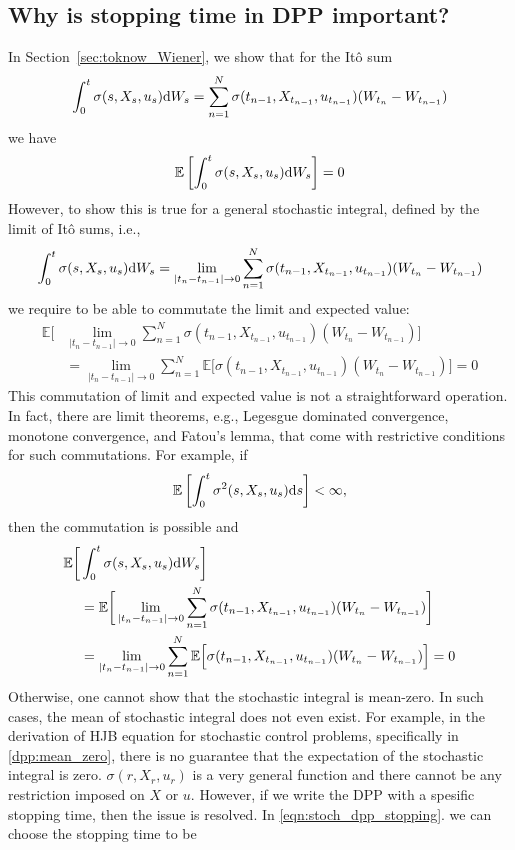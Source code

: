 \documentclass[11pt]{book}
\newcommand{\ds}{\text{\normalfont d}s}
\newcommand{\dW}{\text{\normalfont d}W}
\begin{document}
\subsection{Why is stopping time in DPP important?}
In Section~\ref{sec:toknow_Wiener}, we show that for the Itô sum
\[
\int_0^t \sigma(s,X_s,u_s)\dW_s = \sum_{n=1}^{N} \sigma(t_{n-1},X_{t_{n-1}},u_{t_{n-1}})(W_{t_{n}}-W_{t_{n-1}}) 
\]
we have
\[
\mathbb{E}\left[\int_0^t \sigma(s,X_s,u_s)\dW_s\right]=0
\]
However, to show this is true for a general stochastic integral, defined by the limit of Itô sums, i.e., 
\begin{equation*}
\int_0^t \sigma(s,X_s,u_s)\dW_s = \lim_{|t_n-t_{n-1}|\to0}\sum_{n=1}^{N} \sigma(t_{n-1},X_{t_{n-1}},u_{t_{n-1}})(W_{t_{n}}-W_{t_{n-1}})    
\end{equation*}
we require to be able to commutate the limit and expected value: 
\[
\begin{split}
    \mathbb{E}\bigg[&\lim_{|t_n-t_{n-1}|\to0}\sum_{n=1}^{N} \sigma(t_{n-1},X_{t_{n-1}},u_{t_{n-1}})(W_{t_{n}}-W_{t_{n-1}}) \bigg]\\
    &=\lim_{|t_n-t_{n-1}|\to0}\sum_{n=1}^{N} \mathbb{E}\Big[\sigma(t_{n-1},X_{t_{n-1}},u_{t_{n-1}})(W_{t_{n}}-W_{t_{n-1}})\Big]=0
\end{split}
\]
This commutation of limit and expected value is not a straightforward operation. In fact, there are limit theorems, e.g., Legesgue dominated convergence, monotone convergence, and Fatou's lemma, that come with restrictive conditions for such commutations.
For example, if 
\[
\mathbb{E}\left[\int_0^t \sigma^2(s,X_s,u_s)\ds\right]<\infty,
\]
then the commutation is possible and 
\[
\begin{split}
\mathbb{E}\bigg[&\int_0^t \sigma(s,X_s,u_s)\dW_s\bigg]\\
    &=\mathbb{E}\bigg[\lim_{|t_n-t_{n-1}|\to0}\sum_{n=1}^{N} \sigma(t_{n-1},X_{t_{n-1}},u_{t_{n-1}})(W_{t_{n}}-W_{t_{n-1}}) \bigg]\\
    &=\lim_{|t_n-t_{n-1}|\to0}\sum_{n=1}^{N} \mathbb{E}\Big[\sigma(t_{n-1},X_{t_{n-1}},u_{t_{n-1}})(W_{t_{n}}-W_{t_{n-1}})\Big]=0
\end{split}
\]
Otherwise, one cannot show that the stochastic integral is mean-zero. In such cases, the mean of stochastic integral does not even exist. For example, in the derivation of HJB equation for stochastic control problems, specifically in \eqref{dpp:mean_zero}, there is no guarantee that the expectation of the stochastic integral is zero. $\sigma(r,X_r,u_r)$ is a very general function and there cannot be any restriction imposed on $X$ or $u$. However, if we write the DPP with a spesific stopping time, then the issue is resolved. In \eqref{eqn:stoch_dpp_stopping}. we can choose the stopping time to be
\end{document}
